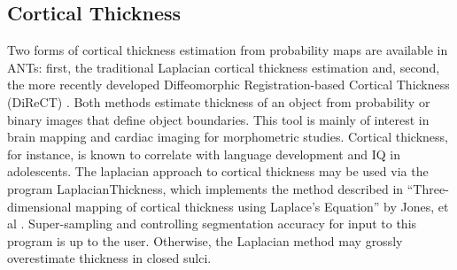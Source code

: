 \documentclass{InsightArticle}
\begin{document}
\subsection{Cortical Thickness}
Two forms of cortical thickness estimation from probability maps are available 
in ANTs: first, the traditional Laplacian cortical thickness estimation and, second, 
the more recently developed Diffeomorphic Registration-based Cortical Thickness 
(DiReCT) \cite{Das2009}.  Both methods estimate thickness of an object 
from probability or binary images that define object boundaries.  This tool 
is mainly of interest in brain mapping and cardiac imaging for morphometric 
studies.  Cortical thickness, for instance, is known to correlate with language 
development and IQ in adolescents.  The laplacian approach to 
cortical thickness may be used via the program LaplacianThickness, 
which implements the method described in ``Three-dimensional mapping of cortical thickness using Laplace's Equation'' by 
Jones, et al \cite{}.  Super-sampling 
and controlling segmentation accuracy for input to this program is up 
to the user.  Otherwise, the Laplacian method may grossly overestimate 
thickness in closed sulci.  

 
\end{document}
